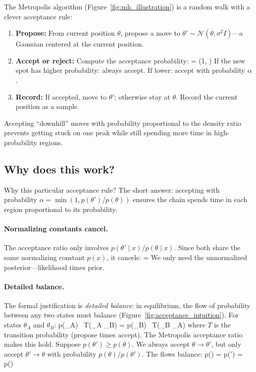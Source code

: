 \documentclass[11pt]{article}
\begin{document}
The Metropolis algorithm (Figure~\ref{fig:mh_illustration}) is a random walk with a clever acceptance rule:

\begin{enumerate}
    \item \textbf{Propose:} From current position $\theta$, propose a move to $\theta' \sim \mathcal{N}(\theta, \sigma^2 I)$---a Gaussian centered at the current position.

    \item \textbf{Accept or reject:} Compute the acceptance probability:
    \beq
    \alpha = \min\left(1, \right)
    \eeq
    If the new spot has higher probability: always accept. If lower: accept with probability $\alpha$.

    \item \textbf{Record:} If accepted, move to $\theta'$; otherwise stay at $\theta$. Record the current position as a sample.
\end{enumerate}

Accepting ``downhill'' moves with probability proportional to the density ratio prevents getting stuck on one peak while still spending more time in high-probability regions.

\subsection{Why does this work?}

Why this particular acceptance rule? The short answer: accepting with probability $\alpha = \min(1, p(\theta')/p(\theta))$ ensures the chain spends time in each region proportional to its probability.

\paragraph{Normalizing constants cancel.} The acceptance ratio only involves $p(\theta' \mid x) / p(\theta \mid x)$. Since both share the same normalizing constant $p(x)$, it cancels:
\beq
{} = 
\eeq
We only need the unnormalized posterior---likelihood times prior.

\paragraph{Detailed balance.} The formal justification is \emph{detailed balance}: in equilibrium, the flow of probability between any two states must balance (Figure~\ref{fig:acceptance_intuition}). For states $\theta_A$ and $\theta_B$:
\beq
p(\theta_A) \, T(\theta_A \to \theta_B) = p(\theta_B) \, T(\theta_B \to \theta_A)
\eeq
where $T$ is the transition probability (propose times accept). The Metropolis acceptance ratio makes this hold. Suppose $p(\theta') \geq p(\theta)$. We always accept $\theta \to \theta'$, but only accept $\theta' \to \theta$ with probability $p(\theta)/p(\theta')$. The flows balance:
\beq
p(\theta)  = p(\theta') \cdot {} = p(\theta) \quad \checkmark
\eeq
\end{document}
